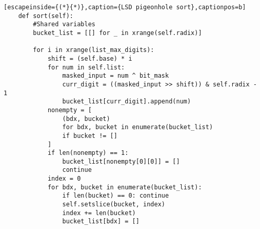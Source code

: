 \documentclass[12pt]{article}
\begin{document}
\begin{table}[H]
	\lstset{
		language=python,
    numbers=left,
    stepnumber=1,
    showstringspaces=false,
    tabsize=3,
    breaklines=true,
    breakatwhitespace=false,}
	\centering
	\begin{lstlisting}[escapeinside={(*}{*)},caption={LSD pigeonhole sort},captionpos=b]
	def sort(self):
		#Shared variables
		bucket_list = [[] for _ in xrange(self.radix)]

		for i in xrange(list_max_digits):
			shift = (self.base) * i
			for num in self.list:
				masked_input = num ^ bit_mask
				curr_digit = ((masked_input >> shift)) & self.radix - 1
				bucket_list[curr_digit].append(num)
			nonempty = [
				(bdx, bucket)
				for bdx, bucket in enumerate(bucket_list)
				if bucket != []
			]
			if len(nonempty) == 1:
				bucket_list[nonempty[0][0]] = []
				continue
			index = 0
			for bdx, bucket in enumerate(bucket_list):
				if len(bucket) == 0: continue
				self.setslice(bucket, index)
				index += len(bucket)
				bucket_list[bdx] = []
\end{lstlisting}
\end{table}
\pagebreak
\end{document}

